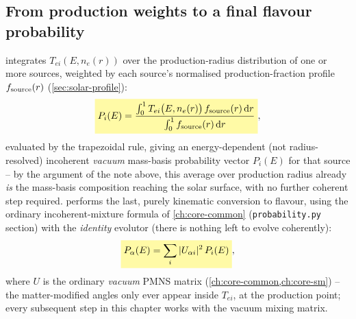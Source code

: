 \begin{theorybox}
\subsection*{From production weights to a final flavour probability}
 integrates $T_{ei}(E,n_e(r))$ over the
production-radius distribution of one or more sources, weighted by each
source's normalised production-fraction profile $f_{\rm source}(r)$
(\cref{sec:solar-profile}):
\begin{equation}
  \keyresult{P_i(E) = \frac{\int_0^1 T_{ei}\bigl(E,n_e(r)\bigr)\,f_{\rm source}(r)\,\mathrm{d}r}
                          {\int_0^1 f_{\rm source}(r)\,\mathrm{d}r}},
\end{equation}
evaluated by the trapezoidal rule, giving an energy-dependent (not
radius-resolved) incoherent \emph{vacuum} mass-basis probability vector
$P_i(E)$ for that source -- by the argument of the note above, this
average over production radius already \emph{is} the mass-basis
composition reaching the solar surface, with no further coherent step
required.  performs the last, purely
kinematic conversion to flavour, using the ordinary incoherent-mixture
formula of
\cref{ch:core-common} (\texttt{probability.py} section) with the
\emph{identity} evolutor (there is nothing left to evolve coherently):
\begin{equation}
  \keyresult{P_\alpha(E) = \sum_i |U_{\alpha i}|^2\,P_i(E)},
\end{equation}
where $U$ is the ordinary \emph{vacuum} PMNS matrix
(\cref{ch:core-common,ch:core-sm}) -- the matter-modified angles only ever
appear inside $T_{ei}$, at the production point; every subsequent step in
this chapter works with the vacuum mixing matrix.
\end{theorybox}

